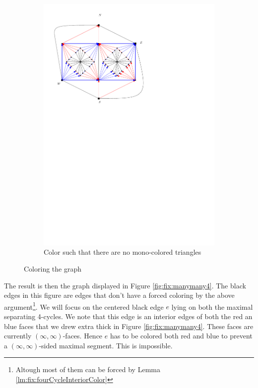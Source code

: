 \begin{figure}[h]
\begin{subfigure}[t]{0.3\textwidth}
      \includegraphics[width=\textwidth]{fixExtension/img/manymany3}
      \caption{Color such that there are no mono-colored triangles}
      \label{fig:fix:manymany3}
    \end{subfigure}
    \caption{Coloring the graph}
    \label{fig:fix:coloring}
  \end{figure}



  The result is then the graph displayed in Figure \ref{fig:fix:manymany4}. The black edges in this figure are edges that don't have a forced coloring by the above argument\footnote{Altough most of them can be forced by Lemma \ref{lm:fix:fourCycleInteriorColor}}.
  We will focus on the centered black edge $e$ lying on both the maximal separating 4-cycles. We note that this edge is an interior edges of both the red an blue faces that we drew extra thick in Figure \ref{fig:fix:manymany4}. These faces are currently $(\infty, \infty)$-faces. Hence $e$ has to be colored both red and blue to prevent a $(\infty, \infty)$-sided maximal segment. This is impossible.


